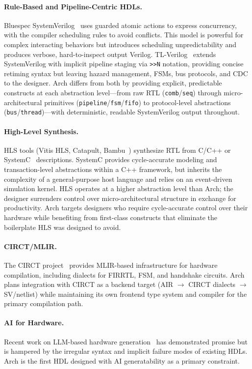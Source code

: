\documentclass[11pt,twocolumn]{article}
\begin{document}
\paragraph{Rule-Based and Pipeline-Centric HDLs.}
Bluespec SystemVerilog~\cite{bluespec} uses guarded atomic actions to express concurrency, with the compiler scheduling rules to avoid conflicts. This model is powerful for complex interacting behaviors but introduces scheduling unpredictability and produces verbose, hard-to-inspect output Verilog. TL-Verilog~\cite{tlverilog} extends SystemVerilog with implicit pipeline staging via \texttt{>>N} notation, providing concise retiming syntax but leaving hazard management, FSMs, bus protocols, and CDC to the designer. Arch differs from both by providing explicit, predictable constructs at each abstraction level---from raw RTL (\texttt{comb}/\texttt{seq}) through micro-architectural primitives (\texttt{pipeline}/\texttt{fsm}/\texttt{fifo}) to protocol-level abstractions (\texttt{bus}/\texttt{thread})---with deterministic, readable SystemVerilog output throughout.

\paragraph{High-Level Synthesis.}
HLS tools (Vitis HLS, Catapult, Bambu~\cite{bambu}) synthesize RTL from C/C++ or SystemC~\cite{systemc} descriptions. SystemC provides cycle-accurate modeling and transaction-level abstractions within a C++ framework, but inherits the complexity of a general-purpose host language and relies on an event-driven simulation kernel. HLS operates at a higher abstraction level than Arch; the designer surrenders control over micro-architectural structure in exchange for productivity. Arch targets designers who require cycle-accurate control over their hardware while benefiting from first-class constructs that eliminate the boilerplate HLS was designed to avoid.

\paragraph{CIRCT/MLIR.}
The CIRCT project~\cite{circt} provides MLIR-based infrastructure for hardware compilation, including dialects for FIRRTL, FSM, and handshake circuits. Arch plans integration with CIRCT as a backend target (AIR $\to$ CIRCT dialects $\to$ SV/netlist) while maintaining its own frontend type system and compiler for the primary compilation path.

\paragraph{AI for Hardware.}
Recent work on LLM-based hardware generation~\cite{thakur2023verigen,liu2023chipnemo,blocklove2023chip} has demonstrated promise but is hampered by the irregular syntax and implicit failure modes of existing HDLs. Arch is the first HDL designed with AI generatability as a primary constraint.
\end{document}
